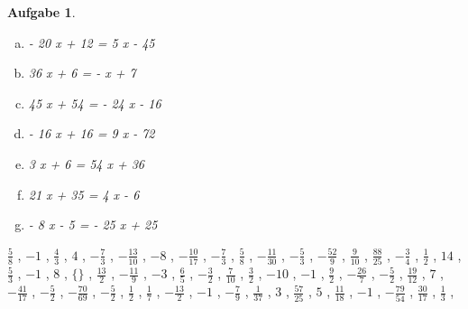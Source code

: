 \documentclass[12pt,fleqn]{article}
\theoremstyle{aufg}
\newtheorem{aufgabe}{Aufgabe}
\theoremstyle{bsp}
\begin{document}
\begin{flushleft}
\begin{aufgabe}
\begin{multicols}{2}
\begin{enumerate}[a)]
50 x - 30 = 14 x - 8
\item 
- 20 x + 12 = 5 x - 45
\item 
36 x + 6 = - x + 7
\item 
45 x + 54 = - 24 x - 16
\item 
- 16 x + 16 = 9 x - 72
\item 
3 x + 6 = 54 x + 36
\item 
21 x + 35 = 4 x - 6
\item 
- 8 x - 5 = - 25 x + 25
\end{enumerate} 
\end{multicols} 
\end{aufgabe} 
$ \scriptstyle\frac{5}{8}$ , $ \scriptstyle-1$ , $ \scriptstyle\frac{4}{3}$ , $ \scriptstyle4$ , $ \scriptstyle- \frac{7}{3}$ , $ \scriptstyle- \frac{13}{10}$ , $ \scriptstyle-8$ , $ \scriptstyle- \frac{10}{17}$ , $ \scriptstyle- \frac{7}{3}$ , $ \scriptstyle\frac{5}{8}$ , $ \scriptstyle- \frac{11}{30}$ , $ \scriptstyle- \frac{5}{3}$ , $ \scriptstyle- \frac{52}{9}$ , $ \scriptstyle\frac{9}{10}$ , $ \scriptstyle\frac{88}{25}$ , $ \scriptstyle- \frac{3}{4}$ , $ \scriptstyle\frac{1}{2}$ , $ \scriptstyle14$ , $ \scriptstyle\frac{5}{3}$ , $ \scriptstyle-1$ , $ \scriptstyle8$ , $ \scriptstyle\{\}$ , $ \scriptstyle\frac{13}{2}$ , $ \scriptstyle- \frac{11}{9}$ , $ \scriptstyle-3$ , $ \scriptstyle\frac{6}{5}$ , $ \scriptstyle- \frac{3}{2}$ , $ \scriptstyle\frac{7}{10}$ , $ \scriptstyle\frac{3}{2}$ , $ \scriptstyle-10$ , $ \scriptstyle-1$ , $ \scriptstyle\frac{9}{2}$ , $ \scriptstyle- \frac{26}{7}$ , $ \scriptstyle- \frac{5}{2}$ , $ \scriptstyle\frac{19}{12}$ , $ \scriptstyle7$ , $ \scriptstyle- \frac{41}{17}$ , $ \scriptstyle- \frac{5}{2}$ , $ \scriptstyle- \frac{70}{69}$ , $ \scriptstyle- \frac{5}{2}$ , $ \scriptstyle\frac{1}{2}$ , $ \scriptstyle\frac{1}{7}$ , $ \scriptstyle- \frac{13}{2}$ , $ \scriptstyle-1$ , $ \scriptstyle- \frac{7}{9}$ , $ \scriptstyle\frac{1}{37}$ , $ \scriptstyle3$ , $ \scriptstyle\frac{57}{25}$ , $ \scriptstyle5$ , $ \scriptstyle\frac{11}{18}$ , $ \scriptstyle-1$ , $ \scriptstyle- \frac{79}{54}$ , $ \scriptstyle\frac{30}{17}$ , $ \scriptstyle\frac{1}{3}$ , \\[0.2em] 

\end{flushleft}
\end{document}
